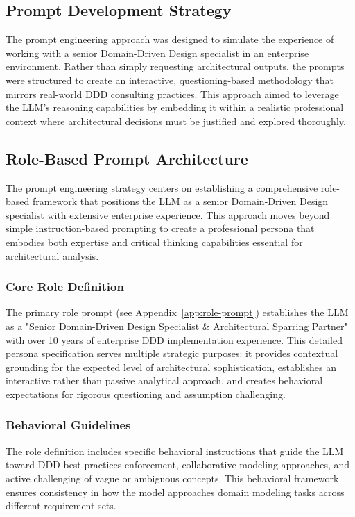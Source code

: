 \subsection{Prompt Development Strategy}
The prompt engineering approach was designed to simulate the experience of working with a senior Domain-Driven Design specialist in an enterprise environment. Rather than simply requesting architectural outputs, the prompts were structured to create an interactive, questioning-based methodology that mirrors real-world DDD consulting practices. This approach aimed to leverage the LLM's reasoning capabilities by embedding it within a realistic professional context where architectural decisions must be justified and explored thoroughly.

\subsection{Role-Based Prompt Architecture}
The prompt engineering strategy centers on establishing a comprehensive role-based framework that positions the LLM as a senior Domain-Driven Design specialist with extensive enterprise experience. This approach moves beyond simple instruction-based prompting to create a professional persona that embodies both expertise and critical thinking capabilities essential for architectural analysis.

\subsubsection{Core Role Definition}
The primary role prompt (see Appendix~\ref{app:role-prompt}) establishes the LLM as a "Senior Domain-Driven Design Specialist \& Architectural Sparring Partner" with over 10 years of enterprise DDD implementation experience. This detailed persona specification serves multiple strategic purposes: it provides contextual grounding for the expected level of architectural sophistication, establishes an interactive rather than passive analytical approach, and creates behavioral expectations for rigorous questioning and assumption challenging.

\subsubsection{Behavioral Guidelines}
The role definition includes specific behavioral instructions that guide the LLM toward DDD best practices enforcement, collaborative modeling approaches, and active challenging of vague or ambiguous concepts. This behavioral framework ensures consistency in how the model approaches domain modeling tasks across different requirement sets.

